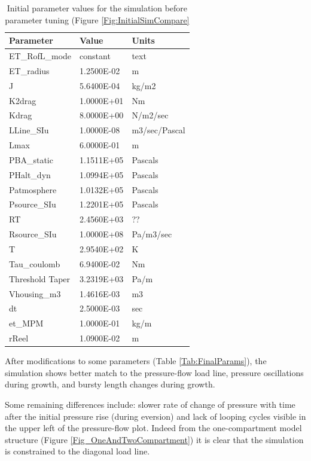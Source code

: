 \documentclass[letterpaper]{article}
\begin{document}
\begin{table}[h]
\centering
\begin{tabular}{l|l|l}
Parameter     &  Value   & Units \\ \hline
ET\_RofL\_mode  &  constant & text \\
ET\_radius  &  1.2500E-02 & m \\
J  &  5.6400E-04 & kg/m2 \\
K2drag  &  1.0000E+01 & Nm \\
Kdrag  &  8.0000E+00 & N/m2/sec \\
LLine\_SIu  &  1.0000E-08 & m3/sec/Pascal \\
Lmax  &  6.0000E-01 & m \\
PBA\_static  &  1.1511E+05 & Pascals \\
PHalt\_dyn  &  1.0994E+05 & Pascals \\
Patmosphere  &  1.0132E+05 & Pascals \\
Psource\_SIu  &  1.2201E+05 & Pascals \\
RT  &  2.4560E+03 & ?? \\
Rsource\_SIu  &  1.0000E+08 & Pa/m3/sec \\
T  &  2.9540E+02 & K \\
Tau\_coulomb  &  6.9400E-02 & Nm \\
Threshold  Taper & 3.2319E+03 & Pa/m \\
Vhousing\_m3  &  1.4616E-03 & m3 \\
dt  &  2.5000E-03 & sec \\
et\_MPM  &  1.0000E-01 & kg/m \\
rReel  &  1.0900E-02 & m \\
\end{tabular}
\caption{Initial parameter values for the simulation before parameter tuning (Figure
\ref{Fig:InitialSimCompare}}\label{Tab:InitialParams}
\end{table}


After modifications to some parameters (Table \ref{Tab:FinalParams}),
the simulation shows better match to the pressure-flow load line, pressure
oscillations during growth, and bursty length changes during growth.

Some remaining differences include: slower rate of change of pressure
with time after the initial pressure rise (during eversion) and
lack of looping cycles visible in the upper left of the pressure-flow
plot.  Indeed from the one-compartment model structure (Figure \ref{Fig_OneAndTwoCompartment}) it is clear that the simulation is
constrained to the diagonal load line.
\end{document}
